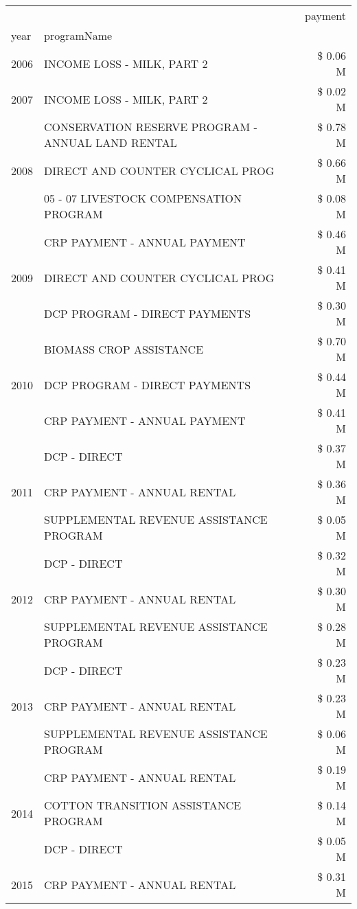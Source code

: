 \begin{tabular}{llr}
\toprule
 &  & payment \\
year & programName &  \\
\midrule
2006 & INCOME LOSS - MILK, PART 2 & \$ 0.06 M \\
\cline{1-3}
2007 & INCOME LOSS - MILK, PART 2 & \$ 0.02 M \\
\cline{1-3}
\multirow[t]{3}{*}{2008} & CONSERVATION RESERVE PROGRAM - ANNUAL LAND RENTAL & \$ 0.78 M \\
 & DIRECT AND COUNTER CYCLICAL PROG & \$ 0.66 M \\
 & 05 - 07 LIVESTOCK COMPENSATION PROGRAM & \$ 0.08 M \\
\cline{1-3}
\multirow[t]{3}{*}{2009} & CRP PAYMENT - ANNUAL PAYMENT & \$ 0.46 M \\
 & DIRECT AND COUNTER CYCLICAL PROG & \$ 0.41 M \\
 & DCP PROGRAM - DIRECT PAYMENTS & \$ 0.30 M \\
\cline{1-3}
\multirow[t]{3}{*}{2010} & BIOMASS CROP ASSISTANCE & \$ 0.70 M \\
 & DCP PROGRAM - DIRECT PAYMENTS & \$ 0.44 M \\
 & CRP PAYMENT - ANNUAL PAYMENT & \$ 0.41 M \\
\cline{1-3}
\multirow[t]{3}{*}{2011} & DCP - DIRECT & \$ 0.37 M \\
 & CRP PAYMENT - ANNUAL RENTAL & \$ 0.36 M \\
 & SUPPLEMENTAL REVENUE ASSISTANCE PROGRAM & \$ 0.05 M \\
\cline{1-3}
\multirow[t]{3}{*}{2012} & DCP - DIRECT & \$ 0.32 M \\
 & CRP PAYMENT - ANNUAL RENTAL & \$ 0.30 M \\
 & SUPPLEMENTAL REVENUE ASSISTANCE PROGRAM & \$ 0.28 M \\
\cline{1-3}
\multirow[t]{3}{*}{2013} & DCP - DIRECT & \$ 0.23 M \\
 & CRP PAYMENT - ANNUAL RENTAL & \$ 0.23 M \\
 & SUPPLEMENTAL REVENUE ASSISTANCE PROGRAM & \$ 0.06 M \\
\cline{1-3}
\multirow[t]{3}{*}{2014} & CRP PAYMENT - ANNUAL RENTAL & \$ 0.19 M \\
 & COTTON TRANSITION ASSISTANCE PROGRAM & \$ 0.14 M \\
 & DCP - DIRECT & \$ 0.05 M \\
\cline{1-3}
\multirow[t]{3}{*}{2015} & CRP PAYMENT - ANNUAL RENTAL & \$ 0.31 M \\

\end{tabular}
